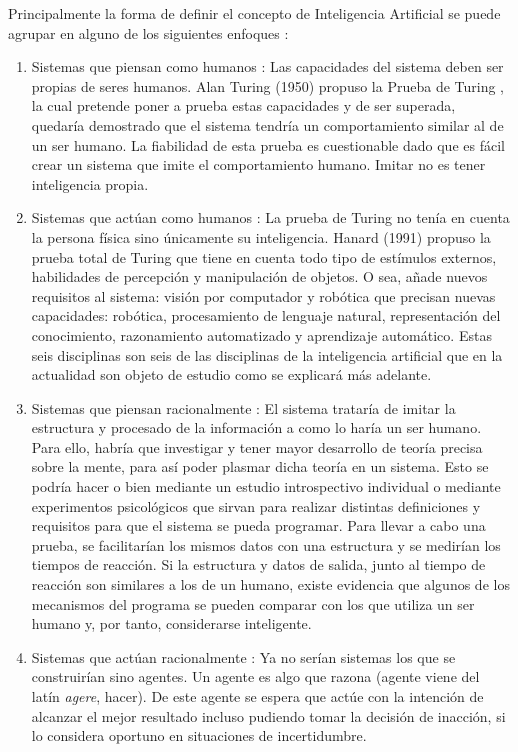 Principalmente la forma de definir el concepto de Inteligencia Artificial se puede agrupar en alguno de los siguientes enfoques \cite{amodernapproach}:
\begin{enumerate}
\item Sistemas que piensan como humanos \cite{haugeland, bellman}: Las capacidades del sistema deben ser propias de seres humanos. Alan Turing (1950) propuso la Prueba de Turing \cite{turing}, la cual pretende poner a prueba estas capacidades y de ser superada, quedaría demostrado que el sistema tendría un comportamiento similar al de un ser humano. La fiabilidad de esta prueba es cuestionable dado que es fácil crear un sistema que imite el comportamiento humano. Imitar no es tener inteligencia propia. \cite{amodernapproach}
\item Sistemas que actúan como humanos \cite{kurzweil, knight}: La prueba de Turing no tenía en cuenta la persona física sino únicamente su inteligencia. Hanard (1991) propuso la prueba total de Turing\cite{harnad} que tiene en cuenta todo tipo de estímulos externos, habilidades de percepción y manipulación de objetos. O sea, añade nuevos requisitos al sistema: visión por computador y robótica que precisan nuevas capacidades: robótica, procesamiento de lenguaje natural, representación del conocimiento, razonamiento automatizado y aprendizaje automático. Estas seis disciplinas son seis de las disciplinas de la inteligencia artificial que en la actualidad son objeto de estudio como se explicará más adelante. \cite{amodernapproach}
\item Sistemas que piensan racionalmente \cite{charniak, winston}: El sistema trataría de imitar la estructura y procesado de la información a como lo haría un ser humano. Para ello, habría que investigar y tener mayor desarrollo de teoría precisa sobre la mente, para así poder plasmar dicha teoría en un sistema. Esto se podría hacer o bien mediante un estudio introspectivo individual o mediante experimentos psicológicos que sirvan para realizar distintas definiciones y requisitos para que el sistema se pueda programar. Para llevar a cabo una prueba, se facilitarían los mismos datos con una estructura y se medirían los tiempos de reacción. Si la estructura y datos de salida, junto al tiempo de reacción son similares a los de un humano, existe evidencia que algunos de los mecanismos del programa se pueden comparar con los que utiliza un ser humano y, por tanto, considerarse inteligente. \cite{amodernapproach}  
\item Sistemas que actúan racionalmente \cite{poole, nilsson}: Ya no serían sistemas los que se construirían sino agentes. Un agente es algo que razona (agente viene del latín \textit{agere}, hacer). De este agente se espera que actúe con la intención de alcanzar el mejor resultado incluso pudiendo tomar la decisión de inacción, si lo considera oportuno en situaciones de incertidumbre. 
\newline


\end{enumerate}
